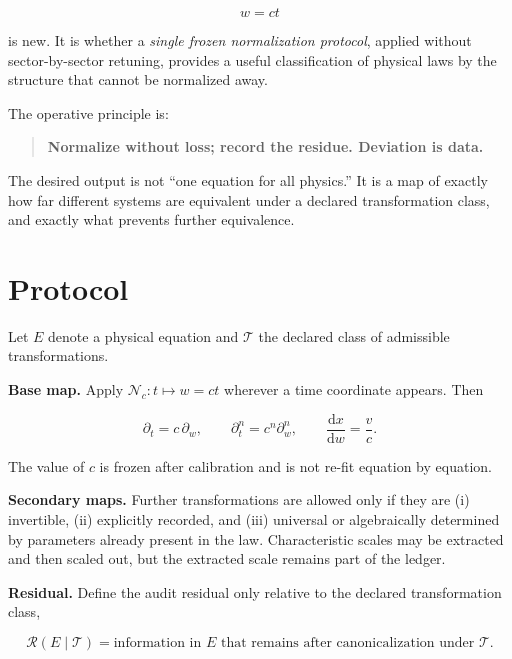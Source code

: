 \documentclass[10pt]{article}
\newcommand{\dd}{\mathrm d}
\newcommand{\res}{\mathcal R}
\newcommand{\trans}{\mathcal T}
\newcommand{\Ncal}{\mathcal N_c}
\begin{document}
\begin{equation}
  w = ct
  \label{eq:base}
\end{equation}

is new. It is whether a \emph{single frozen normalization protocol},
applied without sector-by-sector retuning, provides a useful
classification of physical laws by the structure that cannot be
normalized away.

The operative principle is:

\begin{quote}
\textbf{Normalize without loss; record the residue. Deviation is data.}
\end{quote}

The desired output is not ``one equation for all physics.'' It is a
map of exactly how far different systems are equivalent under a
declared transformation class, and exactly what prevents further
equivalence.

\section{Protocol}

Let \(E\) denote a physical equation and \(\trans\) the declared class
of admissible transformations.

\textbf{Base map.}
Apply \(\Ncal:t\mapsto w=ct\) wherever a time coordinate appears.
Then

\begin{equation}
  \partial_t = c\,\partial_w,
  \qquad
  \partial_t^n = c^n\partial_w^n,
  \qquad
  \frac{\dd x}{\dd w}=\frac{v}{c}.
  \label{eq:derivative}
\end{equation}

The value of \(c\) is frozen after calibration and is not re-fit
equation by equation.

\textbf{Secondary maps.}
Further transformations are allowed only if they are
(i) invertible,
(ii) explicitly recorded, and
(iii) universal or algebraically determined by parameters already
present in the law. Characteristic scales may be extracted and then
scaled out, but the extracted scale remains part of the ledger.

\textbf{Residual.}
Define the audit residual only relative to the declared
transformation class,

\begin{equation}
  \res(E\mid\trans)
  =
  \text{information in }E
  \text{ that remains after canonicalization under }\trans .
  \label{eq:residual}
\end{equation}
\end{document}

